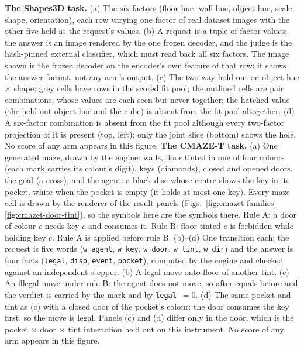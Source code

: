 \textbf{The Shapes3D task.} (a) The six factors (floor hue, wall hue, object hue, scale, shape, orientation), each row varying one factor of real dataset images with the other five held at the request's values. (b) A request is a tuple of factor values; the answer is an image rendered by the one frozen decoder, and the judge is the hash-pinned external classifier, which must read back all six factors. The image shown is the frozen decoder on the encoder's own feature of that row: it shows the answer format, not any arm's output. (c) The two-way hold-out on object hue $\times$ shape: grey cells have rows in the scored fit pool; the outlined cells are pair combinations, whose values are each seen but never together; the hatched value (the held-out object hue and the cube) is absent from the fit pool altogether. (d) A six-factor combination is absent from the fit pool although every two-factor projection of it is present (top, left); only the joint slice (bottom) shows the hole. No score of any arm appears in this figure.
\textbf{The CMAZE-T task.} (a) One generated maze, drawn by the engine: walls, floor tinted in one of four colours (each mark carries its colour's digit), keys (diamonds), closed and opened doors, the goal (a cross), and the agent: a black disc whose centre shows the key in its pocket, white when the pocket is empty (it holds at most one key). Every maze cell is drawn by the renderer of the result panels (Figs.~\ref{fig:cmazet-families}--\ref{fig:cmazet-door-tint}), so the symbols here are the symbols there. Rule A: a door of colour $c$ needs key $c$ and consumes it. Rule B: floor tinted $c$ is forbidden while holding key $c$. Rule A is applied before rule B. (b)--(d) One transition each: the request is five words (\texttt{w\_agent}, \texttt{w\_key}, \texttt{w\_door}, \texttt{w\_tint}, \texttt{w\_dir}) and the answer is four facts (\texttt{legal}, \texttt{disp}, \texttt{event}, \texttt{pocket}), computed by the engine and checked against an independent stepper. (b) A legal move onto floor of another tint. (c) An illegal move under rule B: the agent does not move, so after equals before and the verdict is carried by the mark and by \texttt{legal}~$=0$. (d) The same pocket and tint as (c) with a closed door of the pocket's colour: the door consumes the key first, so the move is legal. Panels (c) and (d) differ only in the door, which is the pocket $\times$ door $\times$ tint interaction held out on this instrument. No score of any arm appears in this figure.
